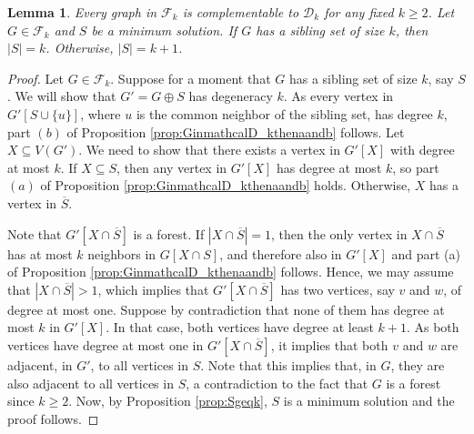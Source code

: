 \documentclass[11pt]{article}
\newtheorem{lemma}[theorem]{Lemma}
\theoremstyle{definition}
\begin{document}
\begin{lemma}
\label{lemma:forest-to-degeneracy}
Every graph in $\mathcal{F}_k$ is complementable to $\mathcal{D}_k$ for any fixed $k\geq 2$.
 Let $G \in \mathcal{F}_k$
and $S$ be a minimum solution.
    If $G$ has a sibling set of size $k$,
    then $|S|=k$. Otherwise, $|S|=k+1$.
\end{lemma}
\begin{proof}
Let $G \in \mathcal{F}_k$.
Suppose for a moment that $G$ has a sibling set of size $k$, say $S$.
We will show that $G'=G \oplus S$ has degeneracy $k$. As every vertex in $G'[S \cup \{u\}]$, where $u$
 is the common neighbor of the sibling set,
has degree $k$, part $(b)$ of Proposition \ref{prop:GinmathcalD_kthenaandb} follows.
Let $X \subseteq V(G')$. We need to show that there exists a vertex in $G'[X]$ with degree at most $k$.
If $X \subseteq S$, then any vertex in $G'[X]$ has degree at most $k$, so part $(a)$ of Proposition \ref{prop:GinmathcalD_kthenaandb} holds.
Otherwise, $X$ has a vertex in $\overline{S}$.

Note that $G'[X \cap \overline{S}]$ is a forest.
If $|X \cap \overline{S}|=1$, then the only vertex in
$X \cap \overline{S}$ has at most $k$ neighbors in $G[X \cap S]$, and therefore also in $G'[X]$ and part (a) of Proposition \ref{prop:GinmathcalD_kthenaandb} follows.  
Hence, we may assume that $|X \cap \overline{S}|>1$, which implies
that $G'[X \cap \overline{S}]$ has two vertices, say $v$ and $w$, of degree at most one.
Suppose by contradiction that none of them has degree at most $k$ in $G'[X]$. In that case, both vertices have degree at least $k+1$. As both vertices have degree at most one in $G'[X \cap \overline{S}]$, it implies that both $v$ and $w$ are adjacent, in $G'$, to all vertices in $S$.
Note that this implies that, in $G$, they are also adjacent to all vertices in $S$, a contradiction to the fact that $G$ is a forest since $k\geq 2$.
Now, by Proposition \ref{prop:Sgeqk}, $S$ is a minimum solution and the proof follows.



\end{proof}
\end{document}
